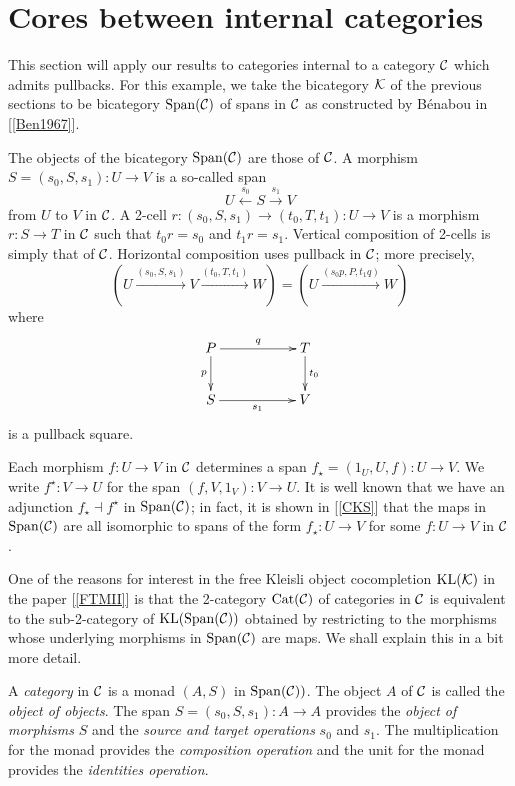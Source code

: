 \documentclass[a4paper,10pt]{article}
\newcommand{\bc}{{\cal{C}}}
\newcommand{\bk}{{\cal{K}}}
\numberwithin{equation}{section}
\begin{document}
\section{Cores between internal categories}\label{cbic}

This section will apply our results to categories internal to a category $\bc$ which admits pullbacks. For this example, we take the bicategory $\bk$ of the previous sections to be bicategory $\mathrm{Span}(\bc)$ of spans in $\bc$ as constructed by B\'enabou in [\ref{Ben1967}].   

The objects of the bicategory $\mathrm{Span}(\bc)$ are those of $\bc$. A morphism $S = (s_0, S, s_1) : U \longrightarrow V$ is a so-called span $$U \overset{s_0} \longleftarrow S \overset{s_1} \longrightarrow V$$ from $U$ to $V$ in $\bc$. A 2-cell $r : (s_0, S, s_1) \longrightarrow (t_0, T, t_1) : U \longrightarrow V$ is a morphism $r:S \longrightarrow T$ in $\bc$ such that $t_0 r = s_0$ and $t_1 r = s_1$. Vertical composition of 2-cells is simply that of $\bc$. Horizontal composition uses pullback in $\bc$; more precisely, $$(U \overset{(s_0,S,s_1)} \longrightarrow V \overset{(t_0,T,t_1)} \longrightarrow W) = (U \overset{(s_0 p,P,t_1 q)} \longrightarrow W)$$ where
\begin{equation}
\xymatrix{
P \ar[rr]^-{q} \ar[d]_-{p} && T \ar[d]^-{t_0} \\
S \ar[rr]_-{s_1} && V}
\end{equation}  
is a pullback square.   

Each morphism $f:U \longrightarrow V$ in $\bc$ determines a span $f_{\star} = (1_U, U, f) : U \longrightarrow V$. We write $f^{\star} : V \longrightarrow U$ for the span $(f, V, 1_V) : V \longrightarrow U$. It is well known that we have an adjunction $f_{\star} \dashv f^{\star}$ in $\mathrm{Span}(\bc)$; in fact, it is shown in [\ref{CKS}] that the maps in $\mathrm{Span}(\bc)$ are all isomorphic to spans of the form $f_{\star} : U \longrightarrow V$ for some $f:U \longrightarrow V$ in $\bc$. 

One of the reasons for interest in the free Kleisli object cocompletion $\mathrm{KL}(\bk)$ in the paper [\ref{FTMII}] is that the 2-category $\mathrm{Cat}(\bc)$ of categories in $\bc$ is equivalent to the sub-2-category of $\mathrm{KL}(\mathrm{Span}(\bc))$ obtained by restricting to the morphisms whose underlying morphisms in $\mathrm{Span}(\bc)$ are maps. We shall explain this in a bit more detail.   

A \textit{category} in $\bc$ is a monad $(A,S)$ in $\mathrm{Span}(\bc))$. The object $A$ of $\bc$ is called the \textit{object of objects}. The span $S = (s_0, S, s_1) : A \longrightarrow A$ provides the \textit{object of morphisms} $S$ and the \textit{source and target operations} $s_0$ and $s_1$. The multiplication for the monad provides the \textit{composition operation} and the unit for the monad provides the \textit{identities operation}.      
\end{document}
